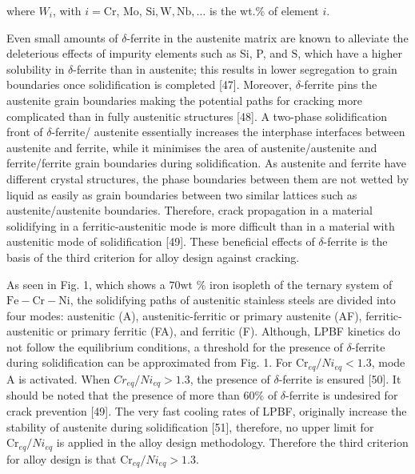 \documentclass[10pt]{article}
\begin{document}
where $W_{i}$, with $i=\mathrm{Cr}$, Mo, $\mathrm{Si}, \mathrm{W}, \mathrm{Nb}, \ldots$ is the wt.\% of element $i$.

Even small amounts of $\delta$-ferrite in the austenite matrix are known to alleviate the deleterious effects of impurity elements such as Si, P, and $\mathrm{S}$, which have a higher solubility in $\delta$-ferrite than in austenite; this results in lower segregation to grain boundaries once solidification is completed [47]. Moreover, $\delta$-ferrite pins the austenite grain boundaries making the potential paths for cracking more complicated than in fully austenitic structures [48]. A two-phase solidification front of $\delta$-ferrite/ austenite essentially increases the interphase interfaces between austenite and ferrite, while it minimises the area of austenite/austenite and ferrite/ferrite grain boundaries during solidification. As austenite and ferrite have different crystal structures, the phase boundaries between them are not wetted by liquid as easily as grain boundaries between two similar lattices such as austenite/austenite boundaries. Therefore, crack propagation in a material solidifying in a ferritic-austenitic mode is more difficult than in a material with austenitic mode of solidification [49]. These beneficial effects of $\delta$-ferrite is the basis of the third criterion for alloy design against cracking.

As seen in Fig. 1, which shows a $70 \mathrm{wt}$ \% iron isopleth of the ternary system of $\mathrm{Fe}-\mathrm{Cr}-\mathrm{Ni}$, the solidifying paths of austenitic stainless steels are divided into four modes: austenitic (A), austenitic-ferritic or primary austenite (AF), ferritic-austenitic or primary ferritic (FA), and ferritic (F). Although, LPBF kinetics do not follow the equilibrium conditions, a threshold for the presence of $\delta$-ferrite during solidification can be approximated from Fig. 1. For $\mathrm{Cr}_{e q} / N i_{e q}<1.3$, mode A is activated. When $C r_{e q} / N i_{e q}>1.3$, the presence of $\delta$-ferrite is ensured [50]. It should be noted that the presence of more than $60 \%$ of $\delta$-ferrite is undesired for crack prevention [49]. The very fast cooling rates of LPBF, originally increase the stability of austenite during solidification [51], therefore, no upper limit for $\mathrm{Cr}_{e q} / N i_{e q}$ is applied in the alloy design methodology. Therefore the third criterion for alloy design is that $\mathrm{Cr}_{e q} / N i_{e q}>1.3$.
\end{document}

